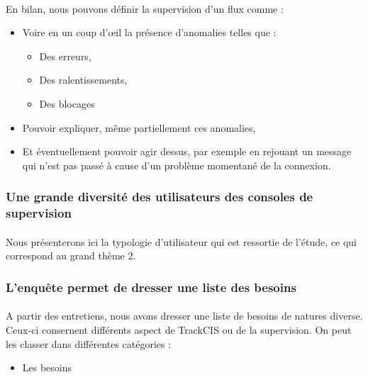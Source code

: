			\paragraph{}
			En bilan, nous pouvons définir la supervision d'un flux comme :
			\begin{itemize}
			  \item Voire en un coup d’œil la présence d’anomalies telles que :
			  	\begin{itemize}
			  	  \item Des erreurs,
			  	  \item Des ralentissements,
			  	  \item Des blocages
		  	    \end{itemize}
			  \item Pouvoir expliquer, même partiellement ces anomalies,
			  \item Et éventuellement pouvoir agir dessus, par exemple en rejouant un
			  message qui n’est pas passé à cause d’un problème momentané de la connexion.
			\end{itemize}
			
		\subsubsection{Une grande diversité des utilisateurs des consoles de
		supervision}
			\paragraph{}%
			Nous présenterons ici la typologie d'utilisateur qui est ressortie de
			l'étude, ce qui correspond au grand thème 2.
			
			\paragraph{}%
			
		\subsubsection{L'enquête permet de dresser une liste des besoins}
			\paragraph{}%
			
			\paragraph{}%
			A partir des entretiens, nous avons dresser une liste de besoins de natures
			diverse. Ceux-ci consernent différents aspect de TrackCIS ou de la
			supervision. On peut les classer dans différentes catégories :
			\begin{itemize}
			  \item Les besoins
			\end{itemize}
	
